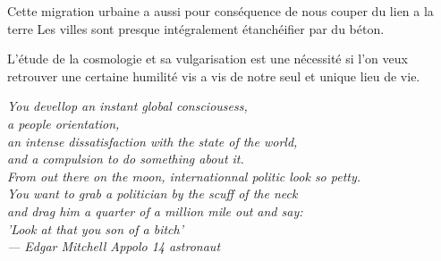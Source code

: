 Cette migration urbaine a aussi pour conséquence de nous couper du lien a la terre
Les villes sont presque intégralement étanchéifier par du béton.

L'étude de la cosmologie et sa vulgarisation est une nécessité si l'on veux retrouver une certaine humilité vis a vis de notre seul et unique lieu de vie.




\begin{flushright}{\slshape    
	You devellop an instant global consciousess, \\
	a people orientation,\\
	an intense dissatisfaction with the state of the world,\\
	and a compulsion to do something about it.\\
	From out there on the moon, internationnal politic look so petty. \\
	You want to grab a politician by the scuff of the neck\\
	and drag him a quarter of a million mile out and say: \\
	'Look at that you son of a bitch'\\ \medskip 
	--- Edgar Mitchell Appolo 14 astronaut }
\end{flushright}